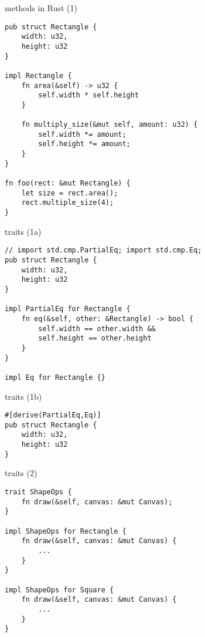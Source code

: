 \usetikzlibrary{positioning,shapes.callouts}
\begin{frame}[fragile,label=rustObjs]{methods in Rust (1)}
\begin{verbatim}
pub struct Rectangle {
    width: u32,
    height: u32
}

impl Rectangle {
    fn area(&self) -> u32 {
        self.width * self.height
    }

    fn multiply_size(&mut self, amount: u32) {
        self.width *= amount;
        self.height *= amount;
    }
}

fn foo(rect: &mut Rectangle) {
    let size = rect.area();
    rect.multiple_size(4);
}
\end{verbatim}
\end{frame}

\begin{frame}[fragile,label=rustTrait1]{traits (1a)}
\begin{verbatim}
// import std.cmp.PartialEq; import std.cmp.Eq;
pub struct Rectangle {
    width: u32,
    height: u32
}

impl PartialEq for Rectangle {
    fn eq(&self, other: &Rectangle) -> bool {
        self.width == other.width &&
        self.height == other.height
    }
}

impl Eq for Rectangle {}
\end{verbatim}
\end{frame}

\begin{frame}[fragile,label=rustTrait1]{traits (1b)}
\begin{verbatim}
#[derive(PartialEq,Eq)]
pub struct Rectangle {
    width: u32,
    height: u32
}
\end{verbatim}
\end{frame}


\begin{frame}[fragile,label=rustTrait2]{traits (2)}
\begin{verbatim}
trait ShapeOps {
    fn draw(&self, canvas: &mut Canvas);
}

impl ShapeOps for Rectangle {
    fn draw(&self, canvas: &mut Canvas) {
        ...
    }
}

impl ShapeOps for Square {
    fn draw(&self, canvas: &mut Canvas) {
        ...
    }
}
\end{verbatim}
\end{frame}
